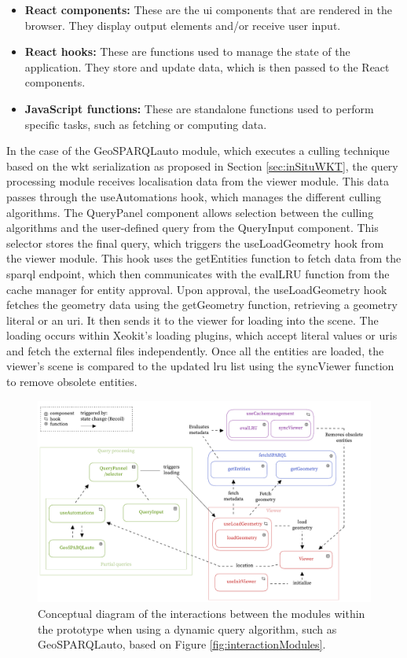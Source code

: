 \begin{itemize}
    \item \textbf{React components:} These are the \ac{ui} components that are rendered in the browser. They display output elements and/or receive user input.
    \item \textbf{React hooks:} These are functions used to manage the state of the application. They store and update data, which is then passed to the React components.
    \item \textbf{JavaScript functions:} These are standalone functions used to perform specific tasks, such as fetching or computing data.
\end{itemize}

In the case of the GeoSPARQLauto module, which executes a culling technique based on the \ac{wkt} serialization as proposed in Section \ref{sec:inSituWKT}, the query processing module receives localisation data from the viewer module. This data passes through the useAutomations hook, which manages the different culling algorithms. The QueryPanel component allows selection between the culling algorithms and the user-defined query from the QueryInput component. This selector stores the final query, which triggers the useLoadGeometry hook from the viewer module. This hook uses the getEntities function to fetch data from the \ac{sparql} endpoint, which then communicates with the evalLRU function from the cache manager for entity approval. Upon approval, the useLoadGeometry hook fetches the geometry data using the getGeometry function, retrieving a geometry literal or an \ac{uri}. It then sends it to the viewer for loading into the scene. The loading occurs within Xeokit's loading plugins, which accept literal values or \ac{uri}s and fetch the external files independently. Once all the entities are loaded, the viewer's scene is compared to the updated \ac{lru} list using the syncViewer function to remove obsolete entities.

\begin{figure}[H]
    \centering
    \includegraphics[width=\textwidth]{figures/pdf/interactions_prototype.pdf}
    \caption[Interactions prototype]{Conceptual diagram of the interactions between the modules within the prototype when using a dynamic query algorithm, such as GeoSPARQLauto, based on Figure \ref{fig:interactionModules}.}
    \label{fig:interactionPrototype}
\end{figure}

